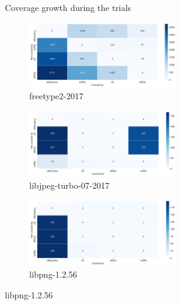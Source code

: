 \begin{figure}
    \caption{Coverage growth during the trials}
    \label{fig:cov-growth}
\end{figure}



\begin{figure}
    \centering
    \begin{subfigure}[t]{\textwidth}
        \centering
        \includegraphics[width=0.70\textwidth]{Experiments/freetype2-2017_pairwise_unique_coverage_plot.png}
        \caption{freetype2-2017}
        \label{fig:sub:freetype-cov-uniq}
    \end{subfigure}

    \begin{subfigure}[t]{\textwidth}
        \centering
        \includegraphics[width=0.70\textwidth]{Experiments/libjpeg-turbo-07-2017_pairwise_unique_coverage_plot.png}
        \caption{libjpeg-turbo-07-2017}
        \label{fig:sub:libjpeg-cov-uniq}
    \end{subfigure}

    \begin{subfigure}[t]{\textwidth}
        \centering
        \includegraphics[width=0.70\textwidth]{Experiments/libpng-1.2.56_pairwise_unique_coverage_plot.png}
        \caption{libpng-1.2.56}
        \label{fig:sub:libpng-cov-uniq}
    \end{subfigure}


\end{figure}
